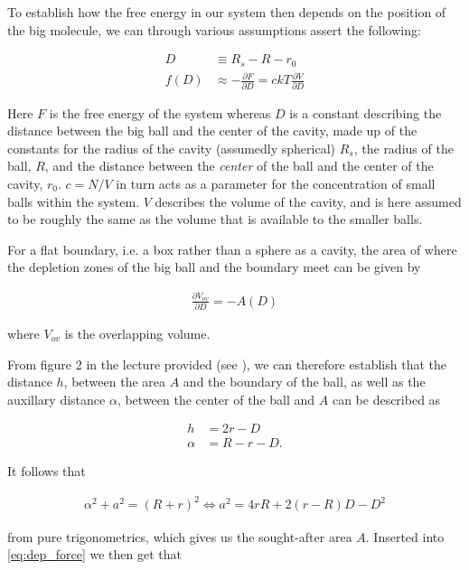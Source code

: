 \documentclass[a4paper,12pt]{article}
\theoremstyle{plain}
\theoremstyle{definition}
\begin{document}
   To establish how the free energy in our system then depends on the position
   of the big molecule, we can through various assumptions assert the following: 

   \begin{align}
      D &\equiv R_s - R - r_0 \\
      f(D) &\approx -\frac{\partial F}{\partial D} = ckT \frac{\partial
      V}{\partial D} \label{eq:dep_force} 
   \end{align}

   Here $F$ is the free energy of the system whereas $D$ is a constant describing 
   the distance between the big ball and the center of the cavity, made up of the 
   constants for the radius of the cavity
   (assumedly spherical) $R_s$, the radius of the ball, $R$, and the distance
   between the \emph{center} of the ball and the center of the cavity,
   $r_0$. $c = N/V$ in turn acts as a parameter for the concentration of small balls within the
   system. $V$ describes the volume of the cavity, and is here
   assumed to be roughly the same as the volume that is available to the smaller balls.

   For a flat boundary, i.e. a box rather than a sphere as a cavity, the area of
   where the depletion zones of the big ball and the boundary meet can be given
   by

   \begin{align}
      \frac{\partial V_{ov}}{\partial D} = -A(D)
   \end{align}
   
   where $V_{ov}$ is the overlapping volume. 

   From figure 2 in the lecture provided (see \cite{lecnotes}), we can therefore establish that
   the distance $h$, between the area $A$ and the boundary of the ball, as well
   as the auxillary distance $\alpha$, between the center of the ball and $A$ can be described as 

   \begin{align*}
      h &= 2r - D \\
      \alpha &= R - r - D.
   \end{align*}
   
   It follows that

   \begin{align}
      \alpha^2 + a^2 = (R + r)^2 \Leftrightarrow a^2 = 4rR + 2(r-R)D - D^2
   \end{align}

   from pure trigonometrics, which gives us the sought-after area $A$. Inserted 
   into \cref{eq:dep_force} we then get that
\end{document}

